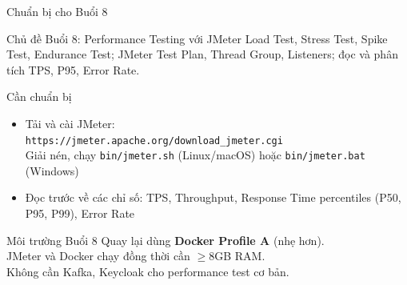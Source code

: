 \documentclass[aspectratio=169,10pt]{beamer}
\begin{document}
\begin{frame}{Chuẩn bị cho Buổi 8}
  \begin{block}{Chủ đề Buổi 8: Performance Testing với JMeter}
    Load Test, Stress Test, Spike Test, Endurance Test;
    JMeter Test Plan, Thread Group, Listeners;
    đọc và phân tích TPS, P95, Error Rate.
  \end{block}

  \vspace{0.4em}
  \begin{block}{Cần chuẩn bị}
    \begin{itemize}
      \item Tải và cài JMeter:\\
        \texttt{https://jmeter.apache.org/download\_jmeter.cgi}\\
        Giải nén, chạy \texttt{bin/jmeter.sh} (Linux/macOS) hoặc
        \texttt{bin/jmeter.bat} (Windows)
      \item Đọc trước về các chỉ số: TPS, Throughput,
        Response Time percentiles (P50, P95, P99), Error Rate
    \end{itemize}
  \end{block}

  \begin{alertblock}{Môi trường Buổi 8}
    Quay lại dùng \textbf{Docker Profile A} (nhẹ hơn).\\
    JMeter và Docker chạy đồng thời cần $\geq$8GB RAM.\\
    Không cần Kafka, Keycloak cho performance test cơ bản.
  \end{alertblock}
\end{frame}
\end{document}
